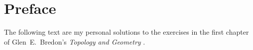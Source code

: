\chapter{Preface}

The following text are my personal solutions to the exercises in the first chapter of Glen~E.~Bredon’s \emph{Topology and Geometry} \cite{bredon_topo_geo}.
